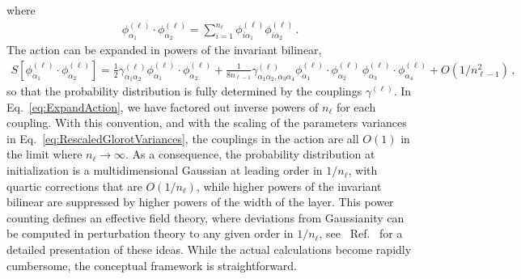 \documentclass[11pt]{article}
\begin{document}
where
\begin{align}
    \label{eq:PhiInvariant}
    \phi^{(\ell)}_{\alpha_1} 
            \cdot \phi^{(\ell)}_{\alpha_2} = 
    \sum_{i=1}^{n_\ell} \phi^{(\ell)}_{i \alpha_1} \phi^{(\ell)}_{i \alpha_2}\, .
\end{align}
The action can be expanded in powers of the invariant bilinear, 
\begin{align}
    \label{eq:ExpandAction}
    S\left[\phi^{(\ell)}_{\alpha_1} 
            \cdot \phi^{(\ell)}_{\alpha_2}\right] = 
        \frac12 \gamma^{(\ell)}_{\alpha_1\alpha_2} 
            \phi^{(\ell)}_{\alpha_1} \cdot \phi^{(\ell)}_{\alpha_2} + 
            \frac{1}{8 n_{\ell-1}} \gamma^{(\ell)}_{\alpha_1\alpha_2,\alpha_3\alpha_4}
            \phi^{(\ell)}_{\alpha_1} \cdot \phi^{(\ell)}_{\alpha_2} \,
            \phi^{(\ell)}_{\alpha_3} \cdot \phi^{(\ell)}_{\alpha_4} + O(1/n_{\ell-1}^2)\, ,
\end{align}
so that the probability distribution is fully determined by the couplings $\gamma^{(\ell)}$. In 
Eq.~\eqref{eq:ExpandAction}, we have factored out inverse powers of $n_\ell$ for each coupling. 
With this convention, and with the scaling of the parameters variances in 
Eq.~\eqref{eq:RescaledGlorotVariances}, the couplings in the action are all $O(1)$ 
in the limit where $n_\ell\to\infty$.
As a consequence, the probability distribution at initialization is a multidimensional Gaussian at 
leading order in $1/n_\ell$, with quartic corrections that are $O(1/n_\ell)$, while higher powers 
of the invariant bilinear are suppressed by higher powers of the width of the layer. This power counting
defines an effective field theory, where deviations from Gaussianity can be computed in perturbation
theory to any given order in $1/n_\ell$, see \eg\ Ref.~\cite{Roberts:2021fes} for a detailed 
presentation of these ideas. While the actual calculations become rapidly cumbersome, the 
conceptual framework is straightforward. 
\end{document}
